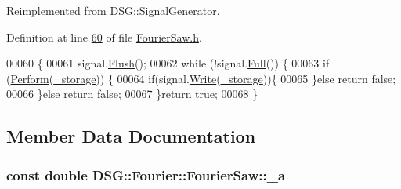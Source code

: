 Reimplemented from \hyperlink{class_d_s_g_1_1_signal_generator_ab050f80e84e6c8b3e354b56930d6a02b}{D\+S\+G\+::\+Signal\+Generator}.



Definition at line \hyperlink{_fourier_saw_8h_source_l00060}{60} of file \hyperlink{_fourier_saw_8h_source}{Fourier\+Saw.\+h}.


\begin{DoxyCode}
00060                                                                       \{
00061             signal.\hyperlink{class_d_s_g_1_1_ring_buffer_ab23c8003d2857809a816068eeb209d60}{Flush}();
00062             \textcolor{keywordflow}{while} (!signal.\hyperlink{class_d_s_g_1_1_ring_buffer_a53ddb04ffcbb5470a8d2b0a3c65b70cb}{Full}()) \{
00063                 \textcolor{keywordflow}{if} (\hyperlink{class_d_s_g_1_1_fourier_1_1_fourier_saw_a33061612ff24180f12e9a2c29dfaa116}{Perform}(\hyperlink{class_d_s_g_1_1_signal_generator_a28a9b47a1aa0783029f11a19ba0363f2}{\_storage})) \{
00064                     \textcolor{keywordflow}{if}(signal.\hyperlink{class_d_s_g_1_1_ring_buffer_aa5dd2caa0a270173251faee40a43d692}{Write}(\hyperlink{class_d_s_g_1_1_signal_generator_a28a9b47a1aa0783029f11a19ba0363f2}{\_storage}))\{
00065                     \}\textcolor{keywordflow}{else} \textcolor{keywordflow}{return} \textcolor{keyword}{false};
00066                 \}\textcolor{keywordflow}{else} \textcolor{keywordflow}{return} \textcolor{keyword}{false};
00067             \}\textcolor{keywordflow}{return} \textcolor{keyword}{true};
00068         \}
\end{DoxyCode}


\subsection{Member Data Documentation}
\hypertarget{class_d_s_g_1_1_fourier_1_1_fourier_saw_a54895160b61b8d84dc967e7815d07869}{
\subsubsection[{\+\_\+a}]{\setlength{\rightskip}{0pt plus 5cm}const double D\+S\+G\+::\+Fourier\+::\+Fourier\+Saw\+::\+\_\+a\hspace{0.3cm}{\ttfamily [protected]}}}\label{class_d_s_g_1_1_fourier_1_1_fourier_saw_a54895160b61b8d84dc967e7815d07869}



